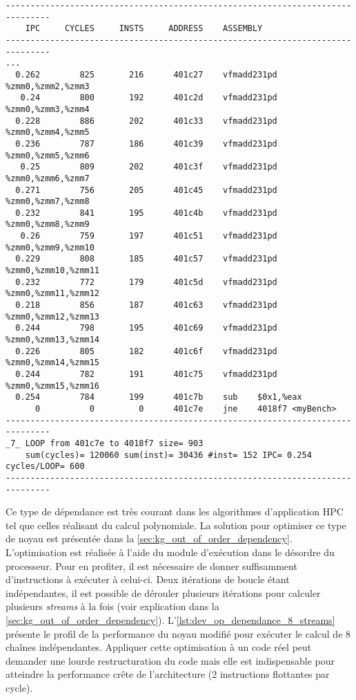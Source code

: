         
 \begin{lstlisting}[label=lst:dev_op_dependance, caption=Noyau de calcul présentant une dépendance entre chaque instruction.]
-------------------------------------------------------------------------------
    IPC     CYCLES     INSTS     ADDRESS    ASSEMBLY                         
-------------------------------------------------------------------------------
...
  0.262        825       216      401c27    vfmadd231pd %zmm0,%zmm2,%zmm3
   0.24        800       192      401c2d    vfmadd231pd %zmm0,%zmm3,%zmm4
  0.228        886       202      401c33    vfmadd231pd %zmm0,%zmm4,%zmm5
  0.236        787       186      401c39    vfmadd231pd %zmm0,%zmm5,%zmm6
   0.25        809       202      401c3f    vfmadd231pd %zmm0,%zmm6,%zmm7
  0.271        756       205      401c45    vfmadd231pd %zmm0,%zmm7,%zmm8
  0.232        841       195      401c4b    vfmadd231pd %zmm0,%zmm8,%zmm9
   0.26        759       197      401c51    vfmadd231pd %zmm0,%zmm9,%zmm10
  0.229        808       185      401c57    vfmadd231pd %zmm0,%zmm10,%zmm11
  0.232        772       179      401c5d    vfmadd231pd %zmm0,%zmm11,%zmm12
  0.218        856       187      401c63    vfmadd231pd %zmm0,%zmm12,%zmm13
  0.244        798       195      401c69    vfmadd231pd %zmm0,%zmm13,%zmm14
  0.226        805       182      401c6f    vfmadd231pd %zmm0,%zmm14,%zmm15
  0.244        782       191      401c75    vfmadd231pd %zmm0,%zmm15,%zmm16
  0.254        784       199      401c7b    sub    $0x1,%eax
      0          0         0      401c7e    jne    4018f7 <myBench>
-------------------------------------------------------------------------------
_7_ LOOP from 401c7e to 4018f7 size= 903 
    sum(cycles)= 120060 sum(inst)= 30436 #inst= 152 IPC= 0.254 cycles/LOOP= 600
-------------------------------------------------------------------------------
\end{lstlisting}

        Ce type de dépendance est très courant dans les algorithmes d'application HPC tel que celles réalisant du calcul polynomiale. La solution pour optimiser ce type de noyau est présentée dans la \autoref{sec:kg_out_of_order_dependency}. L'optimisation est réalisée à l'aide du module d'exécution dans le désordre du processeur. Pour en profiter, il est nécessaire de donner suffisamment d'instructions à exécuter à celui-ci. Deux itérations de boucle étant indépendantes, il est possible de dérouler plusieurs itérations pour calculer plusieurs \textit{streams} à la fois (voir explication dans la \autoref{sec:kg_out_of_order_dependency}). L'\autoref{lst:dev_op_dependance_8_streams} présente le profil de la performance du noyau modifié pour exécuter le calcul de 8 chaînes indépendantes. Appliquer cette optimisation à un code réel peut demander une lourde restructuration du code mais elle est indispensable pour atteindre la performance crête de l'architecture (2 instructions flottantes par cycle).
        

